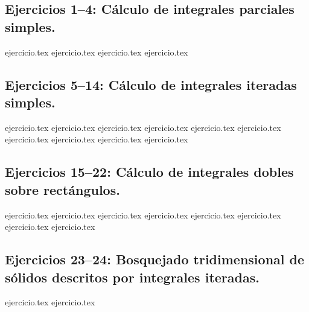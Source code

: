 
\subsection*{Ejercicios 1--4: Cálculo de integrales parciales simples.}
\begin{enumerate}
    {ejercicio.tex}
    {ejercicio.tex}
    {ejercicio.tex}
    {ejercicio.tex}
\end{enumerate}

\subsection*{Ejercicios 5--14: Cálculo de integrales iteradas simples.}
\begin{enumerate}
    \setcounter{enumi}{4}
    {ejercicio.tex}
    {ejercicio.tex}
    {ejercicio.tex}
    {ejercicio.tex}
    {ejercicio.tex}
    {ejercicio.tex}
    {ejercicio.tex}
    {ejercicio.tex}
    {ejercicio.tex}
    {ejercicio.tex}
\end{enumerate}

\subsection*{Ejercicios 15--22: Cálculo de integrales dobles sobre rectángulos.}
\begin{enumerate}
    \setcounter{enumi}{14}
    {ejercicio.tex}
    {ejercicio.tex}
    {ejercicio.tex}
    {ejercicio.tex}
    {ejercicio.tex}
    {ejercicio.tex}
    {ejercicio.tex}
    {ejercicio.tex}
\end{enumerate}

\subsection*{Ejercicios 23--24: Bosquejado tridimensional de sólidos descritos por integrales iteradas.}
\begin{enumerate}
    \setcounter{enumi}{22}
    {ejercicio.tex}
    {ejercicio.tex}
\end{enumerate}

